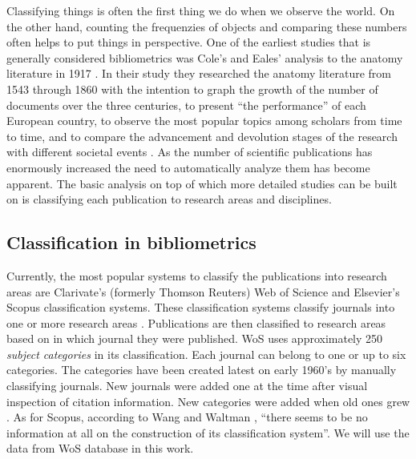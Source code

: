 Classifying things is often the first thing we do when we observe 
the world. On the other hand, counting the frequenzies of objects
and comparing these numbers often helps to put things in 
perspective.
One of the earliest studies that is generally considered
bibliometrics was Cole's and Eales' analysis to the anatomy 
literature in 1917 \cite{cole_history_1917}. In their study they 
researched the anatomy literature from 1543 through 1860 with the 
intention to graph the growth of the number of documents over 
the three centuries, to present ``the performance'' of each 
European country, to observe the most popular topics among 
scholars from time to time, and to compare the advancement and 
devolution stages of the research with different societal 
events \cite{bellis_bibliometrics_2009}.
As the number of scientific publications has enormously increased
the need to automatically analyze them has become apparent.
The basic analysis on top of which more detailed studies can be 
built on is classifying each publication to research areas and
disciplines.


\subsection{Classification in bibliometrics}
Currently, the most popular systems to classify the publications 
into research areas are Clarivate's (formerly Thomson Reuters)
Web of Science and Elsevier's Scopus classification
systems. These classification systems classify journals into
one or more research areas \cite{waltman_new_2012}. Publications
are then classified to research areas based on in which journal they
were published. WoS uses approximately 250 \emph{subject categories}
in its classification. Each journal can belong 
to one or up to six categories. The categories have been created
latest on early 1960's by manually classifying journals.
New journals were added one at the time after visual inspection of
citation information. New categories were added when old ones
grew \cite{pudovkin_algorithmic_2002}. As for Scopus, according to 
Wang and Waltman \cite{wang_large-scale_2016}, ``there seems to be no 
information at all on the construction of its classification 
system''. We will use the data from WoS database in this work.

